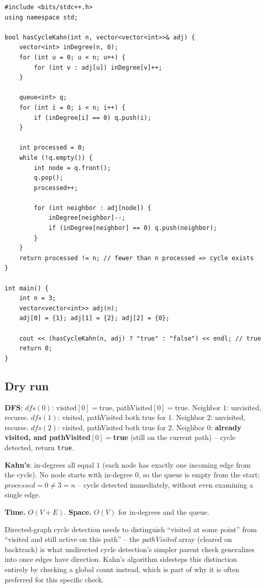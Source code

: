 \begin{lstlisting}
#include <bits/stdc++.h>
using namespace std;

bool hasCycleKahn(int n, vector<vector<int>>& adj) {
    vector<int> inDegree(n, 0);
    for (int u = 0; u < n; u++) {
        for (int v : adj[u]) inDegree[v]++;
    }

    queue<int> q;
    for (int i = 0; i < n; i++) {
        if (inDegree[i] == 0) q.push(i);
    }

    int processed = 0;
    while (!q.empty()) {
        int node = q.front();
        q.pop();
        processed++;

        for (int neighbor : adj[node]) {
            inDegree[neighbor]--;
            if (inDegree[neighbor] == 0) q.push(neighbor);
        }
    }
    return processed != n; // fewer than n processed => cycle exists
}

int main() {
    int n = 3;
    vector<vector<int>> adj(n);
    adj[0] = {1}; adj[1] = {2}; adj[2] = {0};

    cout << (hasCycleKahn(n, adj) ? "true" : "false") << endl; // true
    return 0;
}
\end{lstlisting}

\subsection*{Dry run}


\textbf{DFS}: $\textit{dfs}(0)$: visited$[0]=$true, pathVisited$[0]=$true.
Neighbor $1$: unvisited, recurse. $\textit{dfs}(1)$: visited,
pathVisited both true for $1$. Neighbor $2$: unvisited, recurse.
$\textit{dfs}(2)$: visited, pathVisited both true for $2$. Neighbor
$0$: \textbf{already visited, and pathVisited$[0]=$true} (still on the
current path) -- cycle detected, return \texttt{true}.

\textbf{Kahn's}: in-degrees all equal $1$ (each node has exactly one
incoming edge from the cycle). No node starts with in-degree $0$, so
the queue is empty from the start; $\textit{processed}=0 \neq 3=n$ --
cycle detected immediately, without even examining a single edge.

\begin{complexitybox}
\textbf{Time.} $O(V+E)$.
\textbf{Space.} $O(V)$ for in-degrees and the queue.
\end{complexitybox}

\begin{takeawaybox}
Directed-graph cycle detection needs to distinguish ``visited at some
point'' from ``visited and still active on this path'' -- the
\textit{pathVisited} array (cleared on backtrack) is what undirected
cycle detection's simpler parent check generalizes into once edges have
direction. Kahn's algorithm sidesteps this distinction entirely by
checking a global count instead, which is part of why it is often
preferred for this specific check.
\end{takeawaybox}
